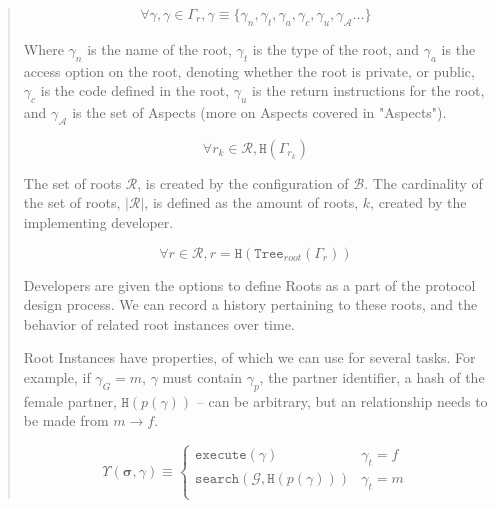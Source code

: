 \documentclass[12pt, titlepage, twocolumn]{report}
\begin{document}
\begin{quotation}
\begin{equation}
\forall \gamma, \gamma \in \Gamma_r , \gamma \equiv \{\gamma_{n}, \gamma_{t},\gamma_{a}, \gamma_{c}, \gamma_{u}, \gamma_{\boldsymbol{\mathcal{A}}} \ldots\}
\end{equation}

Where \(\gamma_{n}\) is the name of the root, \(\gamma_{t}\) is the type of the root, and \(\gamma_{a}\) is the access option on the root, denoting whether the root is private, or public, \(\gamma_{c}\) is the code defined in the root, \(\gamma_{u}\) is the return instructions for the root, and \(\gamma_{\boldsymbol{\mathcal{A}}}\) is the set of Aspects (more on Aspects covered in "Aspects"). 

\begin{equation}
	{ \forall r_k \in \mathcal{R}, \boldsymbol{\texttt{H}}(\Gamma_{r_k}) }
\end{equation}


The set of roots \(\mathcal{R}\), is created by the configuration of \(\boldsymbol{\mathcal{B}}\). The cardinality of the set of roots, \( \vert \mathcal{R} \vert \), is defined as the amount of roots, \(k\), created by the implementing developer. 

\begin{equation}
\forall r \in \mathcal{R}, r = \texttt{H}( \texttt{Tree}_{root}(\Gamma_r))
\end{equation}


Developers are given the options to define Roots as a part of the protocol design process. We can record a history pertaining to these roots, and the behavior of related root instances over time.

Root Instances have properties, of which we can use for several tasks. For example, if \(\gamma_{G} = m\), \(\gamma\) must contain \(\gamma_{p}\), the partner identifier, a hash of the female partner, \( \texttt{H}(p(\gamma)) \) -- can be arbitrary, but an relationship needs to be made from \(m \rightarrow f\).

\begin{equation}
\Upsilon(\boldsymbol{\sigma},\gamma) \equiv  \begin{cases} 
      \texttt{execute}(\gamma) & \gamma_{t} = f \\
      \texttt{search}(\mathcal{G}, \texttt{H}(p(\gamma)))   & \gamma_{t} = m  \\
   \end{cases}
\end{equation}


\end{quotation}
\end{document}
